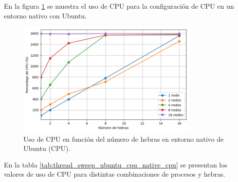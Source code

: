En la figura \ref{fig:thread_sweep_ubuntu_cpu_native_cpu} se muestra el uso de CPU para la configuración de CPU en un entorno nativo con Ubuntu.

\begin{figure}[H]
    \centering
    \includegraphics[width=0.8\textwidth]{imagenes/cap5/thread_sweep_ubuntu_cpu_native_cpu.png}
    \caption{Uso de CPU en función del número de hebras en entorno nativo de Ubuntu (CPU).}
    \label{fig:thread_sweep_ubuntu_cpu_native_cpu}
\end{figure}

En la tabla \ref{tab:thread_sweep_ubuntu_cpu_native_cpu} se presentan los valores de uso de CPU para distintas combinaciones de procesos y hebras.

